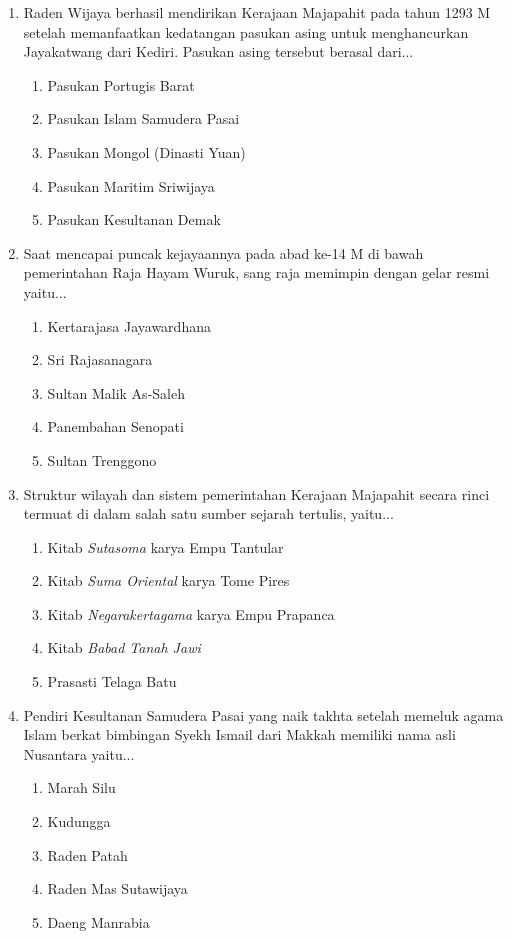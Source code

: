 \documentclass[12pt, a4paper]{article}
\begin{document}
\begin{enumerate}[label=\arabic*.]
    \item Raden Wijaya berhasil mendirikan Kerajaan Majapahit pada tahun 1293 M setelah memanfaatkan kedatangan pasukan asing untuk menghancurkan Jayakatwang dari Kediri. Pasukan asing tersebut berasal dari...
    \begin{enumerate}[label=\Alph*.]
        \item Pasukan Portugis Barat
        \item Pasukan Islam Samudera Pasai
        \item Pasukan Mongol (Dinasti Yuan)
        \item Pasukan Maritim Sriwijaya
        \item Pasukan Kesultanan Demak
    \end{enumerate}

    \item Saat mencapai puncak kejayaannya pada abad ke-14 M di bawah pemerintahan Raja Hayam Wuruk, sang raja memimpin dengan gelar resmi yaitu...
    \begin{enumerate}[label=\Alph*.]
        \item Kertarajasa Jayawardhana
        \item Sri Rajasanagara
        \item Sultan Malik As-Saleh
        \item Panembahan Senopati
        \item Sultan Trenggono
    \end{enumerate}

    \item Struktur wilayah dan sistem pemerintahan Kerajaan Majapahit secara rinci termuat di dalam salah satu sumber sejarah tertulis, yaitu...
    \begin{enumerate}[label=\Alph*.]
        \item Kitab \textit{Sutasoma} karya Empu Tantular
        \item Kitab \textit{Suma Oriental} karya Tome Pires
        \item Kitab \textit{Negarakertagama} karya Empu Prapanca
        \item Kitab \textit{Babad Tanah Jawi}
        \item Prasasti Telaga Batu
    \end{enumerate}

    \item Pendiri Kesultanan Samudera Pasai yang naik takhta setelah memeluk agama Islam berkat bimbingan Syekh Ismail dari Makkah memiliki nama asli Nusantara yaitu...
    \begin{enumerate}[label=\Alph*.]
        \item Marah Silu
        \item Kudungga
        \item Raden Patah
        \item Raden Mas Sutawijaya
        \item Daeng Manrabia
    \end{enumerate}


\end{enumerate}
\end{document}
